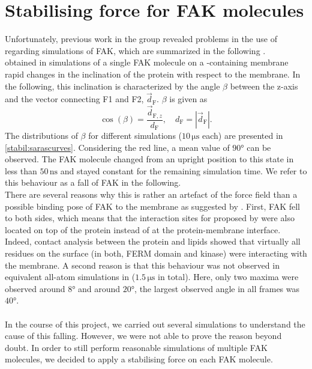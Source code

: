 \section{Stabilising force for FAK molecules}
\label{stabilising}
Unfortunately, previous work in the group revealed problems in the use of \martini{} regarding simulations of FAK, which are summarized in the following \autocite{sara}.\\
\textcite{sara} obtained in simulations of a single FAK molecule on a \pip{}-containing membrane rapid changes in the inclination of the protein with respect to the membrane. In the following, this inclination is characterized by the angle $\beta$ between the z-axis and the vector connecting F1 and F2, $\vec{d}_\text{F}$. $\beta$ is given as
\begin{equation}
\cos\left(\beta\right) = \frac{\vec{d}_{\text{F}, z}}{d_\text{F}},\quad d_\text{F} = \left|\vec{d}_\text{F}\right|.
\end{equation}
The distributions of $\beta$ for different simulations ($10\,\si{\micro\second}$ each) are presented in \autoref{stabil:sarascurves}. Considering the red line, a mean value of $90°$ can be observed. The FAK molecule changed from an upright position to this state in less than $50\,\si{\nano\second}$ and stayed constant for the remaining simulation time. We refer to this behaviour as a fall of FAK in the following.\\
There are several reasons why this is rather an artefact of the \martini{} force field than a possible binding pose of FAK to the membrane as suggested by \textcite{pap002}. First, FAK fell to both sides, which means that the interaction sites for \pip{} proposed by \textcite{pap002} were also located on top of the protein instead of at the protein-membrane interface. Indeed, contact analysis between the protein and \pip{} lipids showed that virtually all residues on the surface (in both, FERM domain and kinase) were interacting with the membrane. A second reason is that this behaviour was not observed in equivalent all-atom simulations in \charmm{} ($1.5\,\si{\micro\second}$ in total). Here, only two maxima were observed around $8°$ and around $20°$, the largest observed angle in all frames was $40°$.\\
\\
In the course of this project, we carried out several simulations to understand the cause of this falling. However, we were not able to prove the reason beyond doubt. In order to still perform reasonable simulations of multiple FAK molecules, we decided to apply a stabilising force on each FAK molecule.\\
